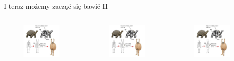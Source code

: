 \documentclass[handout]{beamer}
\begin{document}
\begin{frame}{I teraz możemy zacząć się bawić II}{}
\begin{columns}
    \begin{figure}
        \centering
        \includegraphics[trim={1cm 15cm 0 0}, clip, width=\linewidth]{mem12}
    \end{figure}
    \begin{figure}
        \centering
        \includegraphics[trim={1cm 1cm 0 0}, clip,width=0.75\linewidth]{mem12}
    \end{figure}
    \begin{figure}
        \centering
        \includegraphics[trim={1cm 0cm 10cm 2cm}, clip,width=0.5\linewidth]{mem12}
    \end{figure}


\end{columns}
\end{frame}
\end{document}
